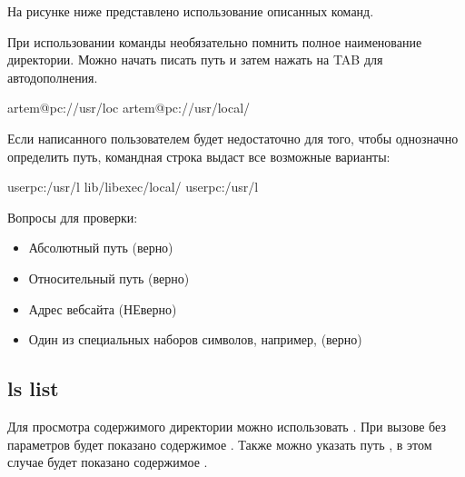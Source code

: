 \documentclass[letterpaper,10pt,russian]{sphinxmanual}
\begin{document}
\sphinxAtStartPar
На рисунке ниже представлено использование описанных команд.

\sphinxAtStartPar
{}

\sphinxAtStartPar
При использовании команды  необязательно помнить полное наименование директории. Можно начать писать путь и затем нажать на TAB для автодополнения.

\begin{sphinxVerbatim}[commandchars=\\\{\}]
artem@pc:/\PYGZdl{}/usr/loc
artem@pc:/\PYGZdl{}/usr/local/
\end{sphinxVerbatim}

\sphinxAtStartPar
Если написанного пользователем будет недостаточно для того, чтобы однозначно определить путь, командная строка выдаст все возможные варианты:

\begin{sphinxVerbatim}[commandchars=\\\{\}]
user\PYGZsh{}pc:/usr/l
lib/libexec/local/
user\PYGZsh{}pc:/usr/l
\end{sphinxVerbatim}

\sphinxAtStartPar
{}

\sphinxAtStartPar
Вопросы для проверки:

\sphinxAtStartPar
{}
\begin{itemize}
\item {} 
\sphinxAtStartPar
Абсолютный путь (верно)

\item {} 
\sphinxAtStartPar
Относительный путь (верно)

\item {} 
\sphinxAtStartPar
Адрес веб\sphinxhyphen{}сайта (НЕверно)

\item {} 
\sphinxAtStartPar
Один из специальных наборов символов, например,  (верно)

\end{itemize}


\subsection{ls \sphinxhyphen{} list}
\label{\detokenize{educational_materials/bash/content:ls-list}}
\sphinxAtStartPar
Для просмотра содержимого директории можно использовать . При вызове без параметров будет показано содержимое . Также можно указать путь , в этом случае будет показано содержимое .
\end{document}
